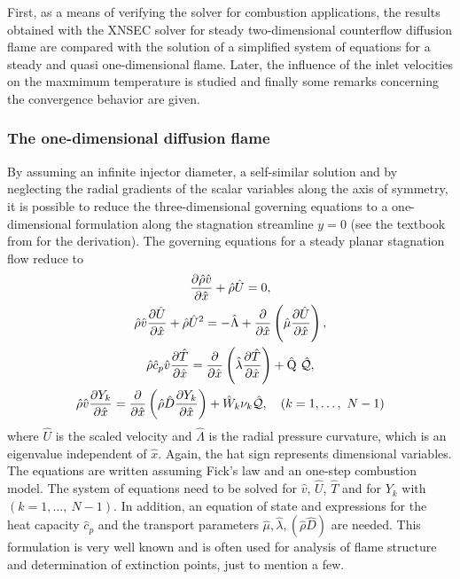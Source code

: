 First, as a means of verifying the solver for combustion applications, the results obtained with the XNSEC solver for steady two-dimensional counterflow diffusion flame are compared with the solution of a simplified system of equations for a steady and quasi one-dimensional flame. Later, the influence of the inlet velocities on the maxmimum temperature is studied and finally some remarks concerning the convergence behavior are given. 
\subsubsection{The one-dimensional diffusion flame}
By assuming an infinite injector diameter, a self-similar solution and by neglecting the radial gradients of the scalar variables along the axis of symmetry, it is possible to reduce the three-dimensional governing equations to a one-dimensional formulation along the stagnation streamline $y = 0$ (see the textbook from \textcite{keeChemicallyReactingFlow2003} for the derivation).  The governing equations for a steady planar stagnation flow reduce to
\begin{subequations}
\begin{gather}
	\frac{\partial\hat\rho \hat v}{\partial \hat x} +  \hat \rho \hat U = 0,\label{eq:OneDimCont}\\ %
	\hat \rho \hat v \frac{\partial \hat U}{\partial \hat x} + \hat \rho \hat U^2 =
	- \hat \Lambda
	+ \frac{\partial}{\partial \hat x}\left(\hat \mu \frac{\partial \hat U}{\partial \hat x}\right),\label{eq:OneDimMom}\\ %
	\hat\rho \hat c_p \hat v \frac{\partial \hat T}{\partial\hat x} =
	\frac{\partial}{\partial \hat x}\left( \hat \lambda \frac{\partial \hat T}{\partial \hat x}\right)
	+\hat\heatRelease~\hat{\mathcal{Q}}\label{eq:OneDimTemp},\\
	\hat\rho \hat v \frac{\partial Y_k}{\partial \hat x} = 
	\frac{\partial}{\partial \hat x}\left(\hat \rho \hat D \frac{\partial Y_k}{\partial \hat x}\right)
	+ \hat W_k \stoicCoef_k \hat{\mathcal{Q}}, \quad (k = 1, \dots,~N - 1) \label{eq:OneDimMF}
\end{gather}\label{eqs:OneDimEquations}%
\end{subequations}
where $\hat U$ is the scaled velocity and $\hat \Lambda$ is the radial pressure curvature, which is an eigenvalue independent of $\hat x$. Again, the hat sign represents dimensional variables. The equations are written assuming Fick's law and an one-step combustion model. The system of equations need to be solved for $\hat v$, $\hat U$, $\hat T$ and for $Y_k$ with $ (k = 1, \dots,~N - 1)$.  In addition, an equation of state and expressions for the heat capacity $\hat c_p$ and the transport parameters $\hat \mu, \hat \lambda, (\hat \rho \hat D)$ are needed. This formulation is very well known and is often used for analysis of flame structure and determination of extinction points, just to mention a few.

